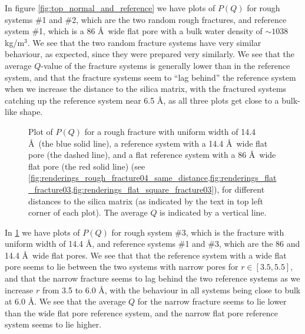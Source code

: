 In figure \cref{fig:top_normal_and_reference} we have plots of $P(Q)$ for rough systems \#1 and \#2, which are the two random rough fractures, and reference system \#1, which is a 86 \AA\ wide flat pore with a bulk water density of $\sim 1038$ kg/m$^3$. We see that the two random fracture systems have very similar behaviour, as expected, since they were prepared very similarly. We see that the average $Q$-value of the fracture systems is generally lower than in the reference system, and that the fracture systems seem to ``lag behind'' the reference system when we increase the distance to the silica matrix, with the fractured systems catching up the reference system near 6.5 \AA, as all three plots get close to a bulk-like shape.

%
\begin{figure}[!p]%
    \centering%
    {%
        \captionsetup{width=\textwidth}%
        \caption{%
            Plot of $P(Q)$ for a rough fracture with uniform width of 14.4 \AA\ (the blue solid line), a reference system with a 14.4 \AA\ wide flat pore (the dashed line), and a flat reference system with a 86 \AA\ wide flat pore (the red solid line) (see \cref{fig:renderings_rough_fracture04_same_distance,fig:renderings_flat_fracture03,fig:renderings_flat_square_fracture03}), for different distances to the silica matrix (as indicated by the text in top left corner of each plot). The average $Q$ is indicated by a vertical line. %
            \label{fig:top_narrow01_and_reference}%
        }%
    }%
\end{figure}%

In \cref{fig:top_narrow01_and_reference} we have plots of $P(Q)$ for rough system \#3, which is the fracture with uniform width of 14.4 \AA, and reference systems \#1 and \#3, which are the 86 and 14.4 \AA\ wide flat pores. %
We see that that the reference system with a wide flat pore seems to lie between the two systems with narrow pores for $r\in[3.5,5.5]$, and that the narrow fracture seems to lag behind the two reference systems as we increase $r$ from 3.5 to 6.0 \AA, with the behaviour in all systems being close to bulk at $6.0$ \AA. We see that the average $Q$ for the narrow fracture seems to lie lower than the wide flat pore reference system, and the narrow flat pore reference system seems to lie higher.

